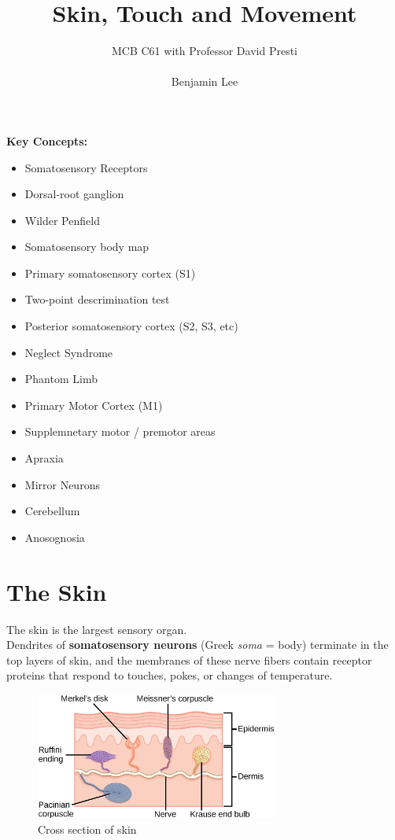 \documentclass{article}
\title{Skin, Touch and Movement}
\author{MCB C61 with Professor David Presti \\ \\ Benjamin Lee}
\begin{document}
\maketitle

\textbf{Key Concepts:}
\begin{itemize}
    \item Somatosensory Receptors
    \item Dorsal-root ganglion
    \item Wilder Penfield
    \item Somatosensory body map
    \item Primary somatosensory cortex (S1)
    \item Two-point descrimination test
    \item Posterior somatosensory cortex (S2, S3, etc)
    \item Neglect Syndrome
    \item Phantom Limb
    \item Primary Motor Cortex (M1)
    \item Supplemnetary motor / premotor areas
    \item Apraxia
    \item Mirror Neurons
    \item Cerebellum
    \item Anosognosia
\end{itemize}

\newpage
\section{The Skin}
The skin is the largest sensory organ. \\
Dendrites of \textbf{somatosensory neurons} (Greek \textit{soma} = body) terminate in the top layers of skin, and the membranes of these nerve fibers contain receptor proteins that respond to touches, pokes, or changes of temperature. \\ 

\begin{figure}[htp]
\centering
\includegraphics[width=8cm]{images/skin.png}
\caption{Cross section of skin}
\label{fig: skin}
\end{figure}
\end{document}
